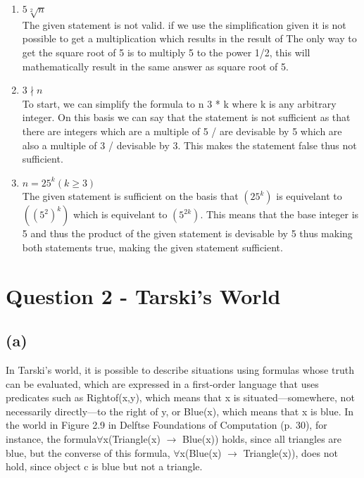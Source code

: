 \documentclass[a4paper]{article}
\begin{document}
\begin{enumerate}
    \item $ 5  \sqrt[2]{n} $ \\
    The given statement is not valid. if we use the simplification given it is not possible to get a multiplication which results in the result of 
    The only way to get the square root of 5 is to multiply 5 to the power 1/2, this will mathematically result in the same answer as square root of 5.
    \item $ 3 \nmid n $ \\
    To start, we can simplify the formula to n  3 * k where k is any arbitrary integer.
    On this basis we can say that the statement is not sufficient as that there are integers which are a multiple of 5 / are devisable by 5 which are also a multiple of 3 / devisable by 3.
    This makes the statement false thus not sufficient.
    \item $ n = 25^k (k \ge 3) $ \\ 
    The given statement is sufficient on the basis that $(25^k)$ is equivelant to $ ((5^2)^k) $ which is equivelant to $ (5^{2k}) $.
    This means that the base integer is 5 and thus the product of the given statement is devisable by 5 thus making both statements true, making the given statement sufficient.
    
\end{enumerate}


\newpage
\section{Question 2 - Tarski's World}
\subsection{(a)}
In Tarski's world, it is possible to describe situations using formulas whose truth can be evaluated,
which are expressed in a first-order language that uses predicates such as Rightof(x,y),
which means that x is situated—somewhere, not necessarily directly—to the right of y, or Blue(x), which means that x is blue.
In the world in Figure 2.9 in Delftse Foundations of Computation (p. 30), for instance,
the formula$\forall $x(Triangle(x) $\rightarrow $ Blue(x)) holds, since all triangles are blue, but the converse of this
formula, $\forall $x(Blue(x) $\rightarrow $ Triangle(x)), does not hold, since object c is blue but not a triangle.
\end{document}
